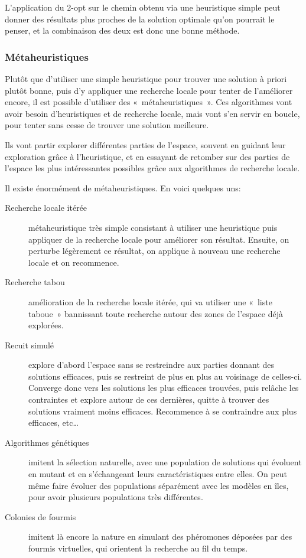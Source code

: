     L'application du 2-opt sur le chemin obtenu via une heuristique simple peut
    donner des résultats plus proches de la solution optimale qu'on pourrait le
    penser, et la combinaison des deux est donc une bonne méthode.

  \subsubsection{Métaheuristiques}

  Plutôt que d'utiliser une simple heuristique pour trouver une solution à priori plutôt
  bonne, puis d'y appliquer une recherche locale pour tenter de l'améliorer encore,
  il est possible d'utiliser des «~métaheuristiques~».
  Ces algorithmes vont avoir besoin d'heuristiques et de recherche locale, mais vont
  s'en servir en boucle, pour tenter sans cesse de trouver une solution meilleure.

  Ils vont partir explorer différentes parties de l'espace, souvent en guidant
  leur exploration grâce à l'heuristique, et en essayant de retomber sur des
  parties de l'espace les plus intéressantes possibles grâce aux algorithmes de
  recherche locale.

  Il existe énormément de métaheuristiques. En voici quelques uns:
  \begin{description}
  \item[Recherche locale itérée] métaheuristique très simple consistant à
    utiliser une heuristique puis appliquer de la recherche locale pour
    améliorer son résultat.  Ensuite, on perturbe légèrement ce résultat, on
    applique à nouveau une recherche locale et on recommence.
  \item[Recherche tabou] amélioration de la recherche locale itérée, qui va
    utiliser une «~liste taboue~» bannissant toute recherche autour des zones de
    l'espace déjà explorées.
  \item[Recuit simulé] explore d'abord l'espace sans se restreindre aux parties
    donnant des solutions efficaces, puis se restreint de plus en plus au
    voisinage de celles-ci. Converge donc vers les solutions les plus efficaces
    trouvées, puis relâche les contraintes et explore autour de ces dernières,
    quitte à trouver des solutions vraiment moins efficaces. Recommence à se
    contraindre aux plus efficaces, etc\dots
  \item[Algorithmes génétiques] imitent la sélection naturelle, avec une
    population de solutions qui évoluent en mutant et en s'échangeant leurs
    caractéristiques entre elles. On peut même faire évoluer des populations
    séparément avec les modèles en îles, pour avoir plusieurs populations très
    différentes.
  \item[Colonies de fourmis] imitent là encore la nature en simulant des
    phéromones déposées par des fourmis virtuelles, qui orientent la recherche
    au fil du temps.
  \end{description}

